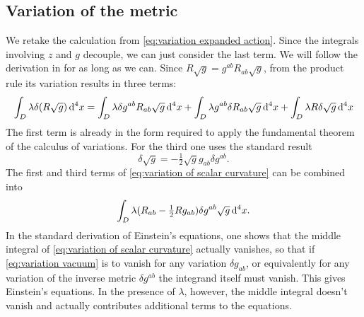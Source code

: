 \documentclass[../main.tex]{subfiles}
\begin{document}
\subsection{Variation of the metric}
We retake the calculation from \cref{eq:variation expanded action}. Since the integrals
involving \( z \) and \( g \) decouple, we can just consider the last term. We will follow the
derivation in \cite{Carroll1997} for as long as we can. Since \( R\sqrt{g} =
g^{ab}R_{ab}\sqrt{g} \), from the product rule its variation results in three terms:
\begin{equation}\label{eq:variation of scalar curvature}
	\int_D \lambda \delta(R \sqrt{g}) \,\mathrm{d}^4 x = \int_D \lambda \delta g^{ab} R_{ab} \sqrt{g}
	\,\mathrm{d}^4 x + \int_D \lambda g^{ab} \delta R_{ab} \sqrt{g} \,\mathrm{d}^4 x + \int_{D} \lambda R
	\delta\sqrt{g} \,\mathrm{d}^4 x
\end{equation}
The first term is already in the form required to apply the fundamental theorem of the
calculus of variations. For the third one uses the standard result
\begin{equation*}
	\delta \sqrt{g} = -\tfrac{1}{2}\sqrt{g} g_{ab} \delta g^{ab}.
\end{equation*}
The first and third terms of \cref{eq:variation of scalar curvature} can be combined into
\begin{equation}\label{eq:variation vacuum}
	\int_D \lambda (R_{ab} - \tfrac{1}{2} Rg_{ab}) \delta g^{ab} \sqrt{g} \,\mathrm{d}^4 x.
\end{equation}
In the standard derivation of Einstein's equations, one shows that the middle integral of
\cref{eq:variation of scalar curvature} actually vanishes, so that if \cref{eq:variation
vacuum} is to vanish for any variation \( \delta g_{ab} \), or equivalently for any
variation of the inverse metric \( \delta g^{ab} \) the integrand itself must
vanish. This gives Einstein's equations. In the presence of \( \lambda \), however, the
middle integral doesn't vanish and actually contributes additional terms to the
equations.
\end{document}
